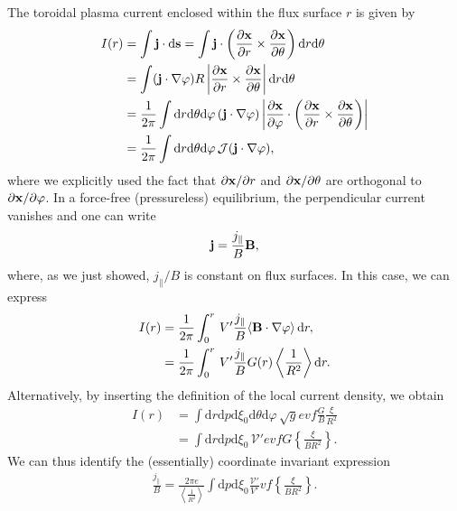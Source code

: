\documentclass[11pt,a4paper]{article}
\newcommand{\rd}{\ensuremath{\mathrm{d}}}
\renewcommand{\b}[1]{\ensuremath{ {\bf #1 } }}
\begin{document}
The toroidal plasma current enclosed within the flux surface $r$ is given by
\begin{align}
I(r) &= \int \b{j}\cdot \rd\b{s} = \int \b{j}\cdot \left(\frac{\partial \b{x}}{\partial r}\times \frac{\partial \b{x}}{\partial \theta}\right) \rd r \rd \theta \nonumber \\
&= \int (\b{j}\cdot\nabla \varphi )R\left|\frac{\partial \b{x}}{\partial r}\times \frac{\partial \b{x}}{\partial \theta} \right| \rd r \rd \theta \nonumber \\
&= \frac{1}{2\pi} \int \rd r \rd\theta \rd\varphi \, (\b{j}\cdot\nabla \varphi )\left|\frac{\partial \b{x}}{\partial \varphi}\cdot\left(\frac{\partial \b{x}}{\partial r}\times \frac{\partial \b{x}}{\partial \theta} \right) \right|   \nonumber \\
&=\frac{1}{2\pi} \int \rd r \rd\theta \rd\varphi \, \mathcal{J}(\b{j}\cdot\nabla \varphi ),
\end{align}
where we explicitly used the fact that $\partial \b{x}/\partial r$ and $\partial \b{x}/\partial \theta$ are orthogonal to $\partial \b{x}/\partial \varphi$. In a force-free (pressureless) equilibrium, the perpendicular current vanishes and one can write 
\begin{align}
\b{j} = \frac{j_\parallel}{B}\b{B},
\end{align}
where, as we just showed, $j_\parallel/B$ is constant on flux surfaces. In this case, we can express
\begin{align}
I(r) &= \frac{1}{2\pi}\int_0^r \,V'\frac{j_\parallel}{B} \langle \b{B}\cdot\nabla \varphi \rangle \, \rd r, \nonumber \\
&=\frac{1}{2\pi}\int_0^r \,V'\frac{j_\parallel}{B}G(r) \left\langle \frac{1}{R^2}\right\rangle \rd r .
\end{align}
Alternatively, by inserting the definition of the local current density, we obtain
\begin{align}
I(r) &= \int \rd r  \rd p \rd \xi_0  \rd\theta\rd\varphi\,\sqrt{g}e v f  \frac{G}{B}\frac{\xi}{R^2} \nonumber \\
&= \int \rd r \rd p \rd \xi_0 \,\mathcal{V}' ev f G \left\{ \frac{\xi}{B R^2}\right\}.
\end{align}
We can thus identify the (essentially) coordinate invariant expression
\begin{align}
\frac{j_\parallel}{B} = \frac{2\pi e}{\left\langle\frac{1}{R^2}\right\rangle}\int \rd p \rd \xi_0 \frac{\mathcal{V}'}{V'} vf \left\{ \frac{\xi}{B R^2}\right\}.
\end{align}
\end{document}
